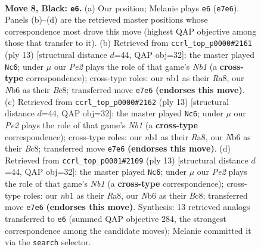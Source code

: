 \documentclass[11pt]{article}
\begin{document}
\begin{figure}[p]\centering
\begin{subfigure}{0.46\textwidth}\centering
\resizebox{\linewidth}{!}{%
\newchessgame
\chessboard[
  setfen={rnbqk2r/pp2ppbp/1n1p2p1/8/3P4/1B3N2/PPP2PPP/RNBQ1RK1 b kq - 1 8},
  showmover=false,
  pgfstyle=straightmove, color=movearrow, markmove={e7-e6}
]}
\caption{}
\end{subfigure}\hfill
\begin{subfigure}{0.46\textwidth}\centering
\resizebox{\linewidth}{!}{%
\newchessgame
\chessboard[
  setfen={rnbqk2r/pp2ppbp/3p1np1/8/2BNP3/2N5/PPP2PPP/R1BQ1RK1 b kq - 3 7},
  showmover=false,
  pgfstyle=straightmove, color=movearrow, markmove={b8-c6}
]}
\caption{}
\end{subfigure}
\\[4pt]
\begin{subfigure}{0.46\textwidth}\centering
\resizebox{\linewidth}{!}{%
\newchessgame
\chessboard[
  setfen={rnbqk2r/pp2ppbp/3p1np1/8/2BNP3/2N5/PPP2PPP/R1BQ1RK1 b kq - 3 7},
  showmover=false,
  pgfstyle=straightmove, color=movearrow, markmove={b8-c6}
]}
\caption{}
\end{subfigure}\hfill
\begin{subfigure}{0.46\textwidth}\centering
\resizebox{\linewidth}{!}{%
\newchessgame
\chessboard[
  setfen={rnbqk2r/pp2ppbp/3p1np1/8/2BNP3/2N5/PPP2PPP/R1BQ1RK1 b kq - 3 7},
  showmover=false,
  pgfstyle=straightmove, color=movearrow, markmove={b8-c6}
]}
\caption{}
\end{subfigure}
\caption{\textbf{Move 8, Black: \texttt{e6}.} (a) Our position; Melanie plays \texttt{e6} (\texttt{e7e6}). Panels (b)--(d) are the retrieved master positions whose correspondence most drove this move (highest QAP objective among those that transfer to it). (b) Retrieved from \texttt{ccrl\_top\_p0000\#2161} (ply 13) [structural distance $d$=44, QAP obj=32]: the master played \texttt{Nc6}; under $\mu$ our \emph{Pe2} plays the role of that game's \emph{Nb1} (a \textbf{cross-type} correspondence); cross-type roles: our \emph{n}b1 as their \emph{R}a8, our \emph{N}b6 as their \emph{B}c8; transferred move \texttt{e7e6} \textbf{(endorses this move)}. (c) Retrieved from \texttt{ccrl\_top\_p0000\#2162} (ply 13) [structural distance $d$=44, QAP obj=32]: the master played \texttt{Nc6}; under $\mu$ our \emph{Pe2} plays the role of that game's \emph{Nb1} (a \textbf{cross-type} correspondence); cross-type roles: our \emph{n}b1 as their \emph{R}a8, our \emph{N}b6 as their \emph{B}c8; transferred move \texttt{e7e6} \textbf{(endorses this move)}. (d) Retrieved from \texttt{ccrl\_top\_p0001\#2109} (ply 13) [structural distance $d$=44, QAP obj=32]: the master played \texttt{Nc6}; under $\mu$ our \emph{Pe2} plays the role of that game's \emph{Nb1} (a \textbf{cross-type} correspondence); cross-type roles: our \emph{n}b1 as their \emph{R}a8, our \emph{N}b6 as their \emph{B}c8; transferred move \texttt{e7e6} \textbf{(endorses this move)}. Synthesis: 13 retrieved analogs transferred to \texttt{e6} (summed QAP objective 284, the strongest correspondence among the candidate moves); Melanie committed it via the \texttt{search} selector.}
\label{fig:thought-m15}
\end{figure}
\end{document}
